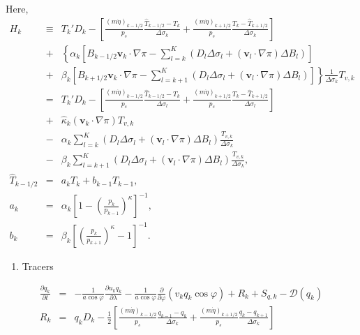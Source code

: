 Here,
\begin{eqnarray}
   H_k 
     &\equiv &  T_k' D_k
              - \left[   \frac{(m\dot{\eta})_{k-1/2}}{p_s} \frac{\hat{T}_{k-1/2} - T_k}{\Delta\sigma_k}
               + \frac{(m\dot{\eta})_{k+1/2}}{p_s} \frac{T_k - \hat{T}_{k+1/2}}{\Delta\sigma_k} \right] \\
        &+& \left\{ \alpha_k
                    \left[ B_{k-1/2} {\mathbf{v}}_k \cdot \nabla \pi
                          - \sum_{l=k}^{K} 
                           (D_l \Delta \sigma_l + ({\mathbf{v}}_l \cdot \nabla \pi)\Delta B_l)
                    \right]
             \right. \\
          &+& \left. \beta_k
                     \left[ B_{k+1/2} {\mathbf{v}}_k \cdot \nabla \pi
                          - \sum_{l=k+1}^{K} 
                           (D_l \Delta \sigma_l + ({\mathbf{v}}_l \cdot \nabla \pi)\Delta B_l)
                    \right]
              \right\} 
              \frac{1}{\Delta \sigma_k} T_{v,k} \\
     &= & T_k' D_k 
          - \left[ \frac{(m\dot{\eta})_{k-1/2}}{p_s} \frac{\hat{T}_{k-1/2} - T_k}{\Delta \sigma_l}
               + \frac{(m\dot{\eta})_{k+1/2}}{p_s} \frac{T_k - \hat{T}_{k+1/2}}{\Delta \sigma_l} \right] \\
        &+& \hat{\kappa}_k ({\mathbf{v}}_k \cdot \nabla \pi) T_{v,k} \\
        &-& \alpha_k \sum_{l=k}^{K} 
                           (D_l \Delta \sigma_l + ({\mathbf{v}}_l \cdot \nabla \pi)\Delta B_l)
                            \frac{T_{v,k}}{\Delta \sigma_k} \\
        &-& \beta_k \sum_{l=k+1}^{K} 
                           (D_l \Delta \sigma_l + ({\mathbf{v}}_l \cdot \nabla \pi)\Delta B_l)
                            \frac{T_{v,k}}{\Delta \sigma_k}, \\
  \hat{T}_{k-1/2}
   &=& a_k T_k + b_{k-1} T_{k-1}, \\
  a_k  &=&  \alpha_k
              \left[ 1- \left( \frac{ p_k }{ p_{k-1} }
                        \right)^{\kappa} \right]^{-1},  \\
  b_k  &=&  \beta_k 
              \left[ \left( \frac{ p_k }{ p_{k+1} } 
                     \right)^{\kappa} - 1 \right]^{-1} . 
\end{eqnarray}

\begin{enumerate}
\def\labelenumi{\arabic{enumi}.}
\setcounter{enumi}{4}
\tightlist
\item
  Tracers
\end{enumerate}
\begin{eqnarray}
  \frac{\partial q_k}{\partial t}
      &=&   - \frac{1}{a\cos\varphi} 
               \frac{\partial u_k q_k}{\partial \lambda}
          - \frac{1}{a\cos\varphi}
               \frac{\partial }{\partial \varphi} ( v_k q_k\cos\varphi)
          + R_k 
          + S_{q,k}
          - {\mathcal D}(q_k) \\
R_k  &=&  q_k D_k 
       - \frac{1}{2} 
             \left[   \frac{(m\dot{\eta})_{k-1/2}}{p_s} \frac{q_{k-1} - q_k}{\Delta\sigma_k}
               + \frac{(m\dot{\eta})_{k+1/2}}{p_s} \frac{q_k   - q_{k+1}}{\Delta\sigma_k} \right]
\end{eqnarray}

